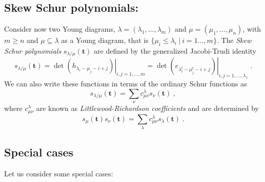 \subsection{Skew Schur polynomials:} Consider now two Young diagrams,
\(\lambda = (\lambda_1, \dots, \lambda_m)\) and \(\mu = (\mu_1, \dots,
\mu_n)\), with \(m\geq n\) and \(\mu \subseteq \lambda\) as a Young
diagram, that is \(\{\mu_i \leq \lambda_i \ | \ i = 1\dots, m\}\).
The \emph{Skew Schur polynomials} \(s_{\lambda/\mu}(\mathbf{t}) \) are
defined by the generalized Jacobi-Trudi identity
\begin{equation}
s_{\lambda/\mu}(\mathbf{t}) = \left. \det\left( h_{\lambda_i-\mu_j
  -i+j} \right)\right|_{i,j=1,\dots, m} = \left. \det\left(
e_{\lambda^t_i-\mu^t_j -i+j} \right)\right|_{i,j=1,\dots, \lambda_1} \; .
\end{equation}
We can also write these functions in terms of the ordinary Schur
functions as
\begin{equation}
s_{\lambda/\mu}(\mathbf{t}) = \sum_{\nu} c_{\mu \nu}^\lambda s_{\nu}(\mathbf{t}) \; ,
\end{equation}
where \(c_{\mu \nu}^\lambda\) are known as \emph{Littlewood-Richardson
coefficients} and are determined by
\begin{equation}
s_{\mu}(\mathbf{t}) s_{\nu}(\mathbf{t})= \sum_{\lambda} c_{\mu
  \nu}^\lambda s_{\lambda}(\mathbf{t})\; .
\end{equation}


\subsection{Special cases} Let us consider some special cases:

